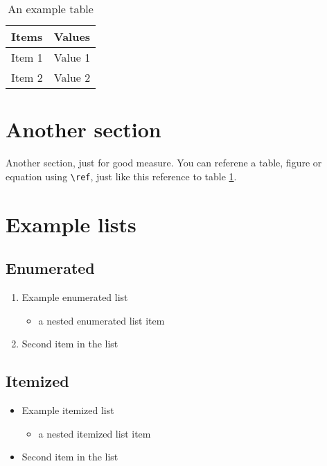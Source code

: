 \documentclass[11pt,openright,a4paper]{report}
\begin{document}
\begin{table}[htb]
\begin{center}
\caption{An example table}
\label{Example-Table}
\begin{tabular}{|l|l|}
\hline
Items & Values \\
\hline
\hline
Item 1 & Value 1 \\
Item 2 & Value 2 \\
\hline
\end{tabular}
\end{center}
\end{table}

\section[short section title]{Another section}
Another section, just for good measure.
You can referene a table, figure or equation using \verb|\ref|, just
like this reference to table \ref{Example-Table}.

\section{Example lists}

\subsection{Enumerated}

\begin{enumerate}
\item Example enumerated list
  \begin{itemize}
  \item a nested enumerated list item
  \end{itemize}
\item Second item in the list
\end{enumerate}

\subsection{Itemized}

\begin{itemize}
\item Example itemized list
  \begin{itemize}
  \item a nested itemized list item
  \end{itemize}
\item Second item in the list
\end{itemize}
\end{document}
